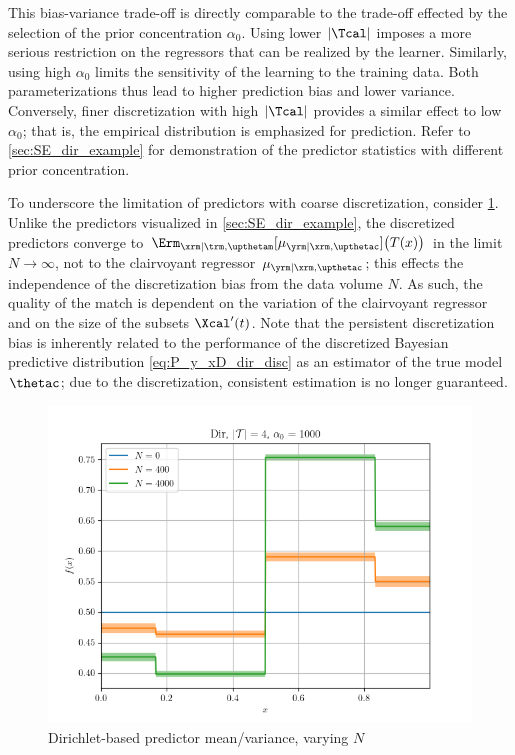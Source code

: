 \documentclass[12pt]{report}
\begin{document}
This bias-variance trade-off is directly comparable to the trade-off effected by the selection of the prior concentration $\alpha_0$. Using lower $|\Tcal|$ imposes a more serious restriction on the regressors that can be realized by the learner. Similarly, using high $\alpha_0$ limits the sensitivity of the learning to the training data. Both parameterizations thus lead to higher prediction bias and lower variance. Conversely, finer discretization with high $|\Tcal|$ provides a similar effect to low $\alpha_0$; that is, the empirical distribution is emphasized for prediction. Refer to \cref{sec:SE_dir_example} for demonstration of the predictor statistics with different prior concentration. 

To underscore the limitation of predictors with coarse discretization, consider \cref{fig:Discretization/SE/predict_N_T4_a0_high}. Unlike the predictors visualized in \cref{sec:SE_dir_example}, the discretized predictors converge to $\Erm_{\xrm | \trm, \upthetam}[\mu_{\yrm | \xrm,\upthetac}]\big(T(x)\big)$ in the limit $N \to \infty$, not to the clairvoyant regressor $\mu_{\yrm | \xrm,\upthetac}$; this effects the independence of the discretization bias from the data volume $N$. As such, the quality of the match is dependent on the variation of the clairvoyant regressor and on the size of the subsets $\Xcal'(t)$. Note that the persistent discretization bias is inherently related to the performance of the discretized Bayesian predictive distribution \eqref{eq:P_y_xD_dir_disc} as an estimator of the true model $\thetac$; due to the discretization, consistent estimation is no longer guaranteed.
\begin{figure}
	\centering
	\includegraphics[width=0.8\linewidth]{Discretization/SE/predict_N_T4_a0_high.png}
	\caption{Dirichlet-based predictor mean/variance, varying $N$}
	\label{fig:Discretization/SE/predict_N_T4_a0_high}
\end{figure}
\end{document}
